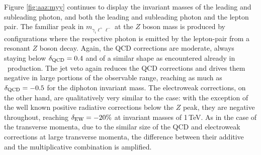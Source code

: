 Figure \ref{fig:aaz:myy} continues to display the invariant masses 
of the leading and subleading photon, and both the leading and 
subleading photon and the lepton pair. 
The familiar peak in $m_{\gamma_i\ell^+\ell^-}$ at the $Z$ boson mass 
is produced by 
configurations where the respective photon is emitted by the 
lepton-pair from a resonant $Z$ boson decay. 
Again, the QCD corrections are moderate, always staying below 
$\delta_\text{QCD}=0.4$ and of a similar shape as encountered already in 
\aaw\ production. 
The jet veto again reduces the QCD corrections and drives them negative 
in large portions of the observable range, reaching as much as 
$\delta_\text{QCD}=-0.5$ for the diphoton invariant mass. 
The electroweak corrections, on the other hand, are qualitatively very similar 
to the \aaw case: with the exception of the well known positive 
radiative corrections below the $Z$ peak, they are negative 
throughout, reaching $\delta_\text{EW}=-20\%$ at invariant masses of 
1\,TeV.
As in the case of the transverse momenta, due to the similar size 
of the QCD and electroweak corrections at large transverse 
momenta, the difference between their additive and the multiplicative 
combination is amplified.


